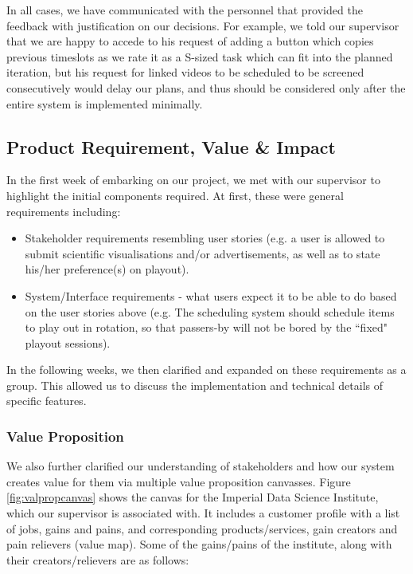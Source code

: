 \documentclass[a4paper, titlepage]{article}
\begin{document}
In all cases, we have communicated with the personnel that provided the
feedback with justification on our decisions. For example, we told
our supervisor that we are happy to accede to his request of adding a button which copies previous timeslots as we rate it as a S-sized task which can fit into the planned iteration, but his request for linked videos to be scheduled to be screened consecutively would delay our plans, and thus should be considered only after the entire system is implemented minimally.

\subsection{Product Requirement, Value \& Impact}

In the first week of embarking on our project, we met with our supervisor to highlight the initial components required. At first, these were general
requirements including:

\begin{itemize}

  \item Stakeholder requirements resembling user stories (e.g. a user is allowed to submit scientific visualisations and/or advertisements, as well as to state his/her preference(s) on playout).

  \item System/Interface requirements - what users expect it to be able to do based on the user stories above (e.g. The scheduling system should schedule items to play out in rotation, so that passers-by will not be bored by the ``fixed" playout sessions).

\end{itemize}

In the following weeks, we then clarified and expanded on these requirements as a group. This allowed us to discuss the implementation and technical details of specific features.

\subsubsection{Value Proposition}

We also further clarified our understanding of stakeholders and how our system creates value for them via multiple value proposition canvasses. Figure \ref{fig:valpropcanvas} shows the canvas for the Imperial Data Science Institute, which our supervisor is associated with. It includes a customer profile with a list of jobs, gains and pains, and corresponding products/services, gain creators and pain relievers (value map). Some of the gains/pains of the institute, along with their creators/relievers are as follows:
\end{document}
